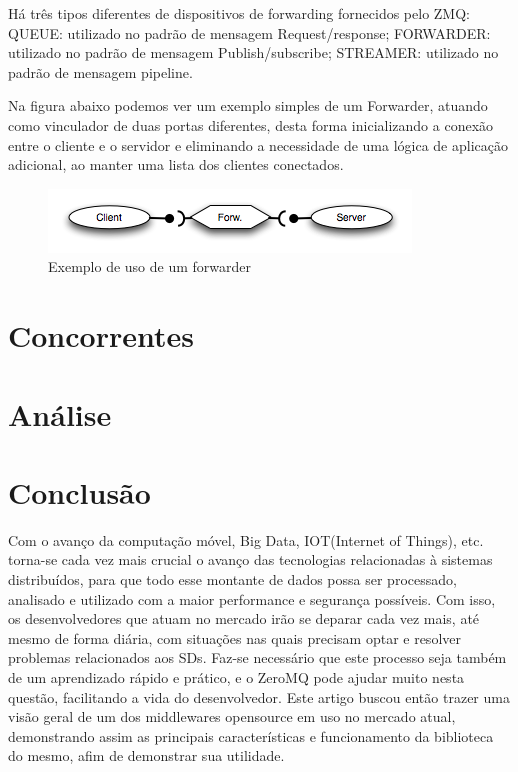 \documentclass[12pt]{article}
\begin{document}
	Há três tipos diferentes de dispositivos de forwarding fornecidos pelo ZMQ: 
QUEUE: utilizado no padrão de mensagem Request/response; FORWARDER: utilizado no padrão de mensagem Publish/subscribe; STREAMER: utilizado no padrão de mensagem pipeline.

	Na figura abaixo podemos ver um exemplo simples de um Forwarder, atuando como vinculador de duas portas diferentes, desta forma inicializando a conexão entre o cliente e o servidor e eliminando a necessidade de uma lógica de aplicação adicional, ao manter uma lista dos clientes conectados.

\begin{figure}[ht]
\centering
\includegraphics[width=.5\textwidth]{cfs.png}
\caption{Exemplo de uso de um forwarder}
\label{fig:exampleFig3}
\end{figure}

\section{Concorrentes}

\section{Análise}
\section{Conclusão}

	Com o avanço da computação móvel, Big Data, IOT(Internet of Things), etc. torna-se cada vez mais crucial o avanço das tecnologias relacionadas à sistemas distribuídos, para que todo esse montante de dados possa ser processado, analisado e utilizado com a maior performance e segurança possíveis. Com isso, os desenvolvedores que atuam no mercado irão se deparar cada vez mais, até mesmo de forma diária, com situações nas quais precisam optar e resolver problemas relacionados aos SDs. Faz-se necessário que este processo seja também de um aprendizado rápido e prático, e o ZeroMQ pode ajudar muito nesta questão, facilitando a vida do desenvolvedor. Este artigo buscou então trazer uma visão geral de um dos middlewares opensource em uso no mercado atual, demonstrando assim as principais características e funcionamento da biblioteca do mesmo, afim de demonstrar sua utilidade.
\end{document}
